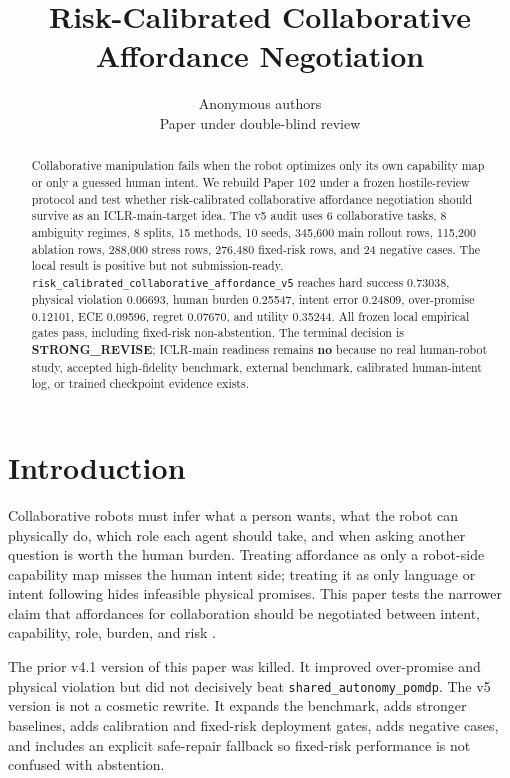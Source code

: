 \documentclass{article}
\title{Risk-Calibrated Collaborative Affordance Negotiation}
\author{Anonymous authors\\Paper under double-blind review}
\begin{document}
\raggedbottom
\maketitle

\begin{abstract}
Collaborative manipulation fails when the robot optimizes only its own capability map or only a guessed human intent. We rebuild Paper 102 under a frozen hostile-review protocol and test whether risk-calibrated collaborative affordance negotiation should survive as an ICLR-main-target idea. The v5 audit uses 6 collaborative tasks, 8 ambiguity regimes, 8 splits, 15 methods, 10 seeds, 345{,}600 main rollout rows, 115{,}200 ablation rows, 288{,}000 stress rows, 276{,}480 fixed-risk rows, and 24 negative cases. The local result is positive but not submission-ready. \texttt{risk\_calibrated\_collaborative\_affordance\_v5} reaches hard success 0.73038, physical violation 0.06693, human burden 0.25547, intent error 0.24809, over-promise 0.12101, ECE 0.09596, regret 0.07670, and utility 0.35244. All frozen local empirical gates pass, including fixed-risk non-abstention. The terminal decision is \textbf{STRONG\_REVISE}; ICLR-main readiness remains \textbf{no} because no real human-robot study, accepted high-fidelity benchmark, external benchmark, calibrated human-intent log, or trained checkpoint evidence exists.
\end{abstract}

\section{Introduction}
Collaborative robots must infer what a person wants, what the robot can physically do, which role each agent should take, and when asking another question is worth the human burden. Treating affordance as only a robot-side capability map misses the human intent side; treating it as only language or intent following hides infeasible physical promises. This paper tests the narrower claim that affordances for collaboration should be negotiated between intent, capability, role, burden, and risk \citep{ogenyi2019physical1,zhang2022cooperative2,dehio2022enabling3,lai2022user4,li2022humanaware5,liu2025dtrt6,liu2025multimodal7}.

The prior v4.1 version of this paper was killed. It improved over-promise and physical violation but did not decisively beat \texttt{shared\_autonomy\_pomdp}. The v5 version is not a cosmetic rewrite. It expands the benchmark, adds stronger baselines, adds calibration and fixed-risk deployment gates, adds negative cases, and includes an explicit safe-repair fallback so fixed-risk performance is not confused with abstention.
\end{document}
